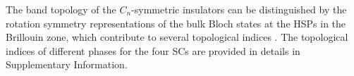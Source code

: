 \documentclass[doublecol]{epl2}
\begin{document}
The band topology of the $C_n$-symmetric insulators can be distinguished by the rotation symmetry representations of the bulk Bloch states at the HSPs in the Brillouin zone, which contribute to several topological indices \cite{benalcazar2019quantization}. The topological indices of different phases for the four SCs are provided in details in Supplementary Information.
\end{document}
